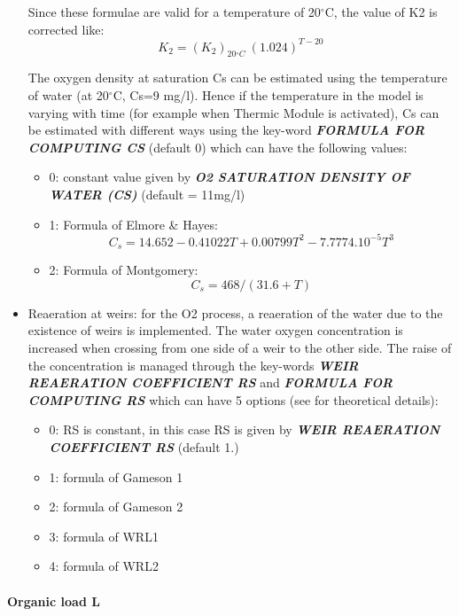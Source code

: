 \begin{itemize}
 Since these formulae are valid for a temperature of 20${}^\circ$C, the value of K2 is corrected like:
\[K_2={\left(K_2\right)}_{20{}^\circ C}\ {\left(1.024\right)}^{T-20}\]


 The oxygen density at saturation Cs can be estimated using the temperature of water (at 20${}^\circ$C, Cs=9 mg/l). Hence if the temperature in the model is varying with time (for example when Thermic Module is activated), Cs can be estimated with different ways using the key-word \textbf{\textit{FORMULA FOR COMPUTING CS}} (default 0) which can have the following values:

\begin{itemize}
\item  0: constant value given by \textbf{\textit{O2 SATURATION DENSITY OF WATER (CS)}} (default = 11mg/l)

\item  1: Formula of Elmore \& Hayes:
\[C_s=14.652-0.41022T+0.00799T^2-7.7774.{10}^{-5}T^3\]

\item  2: Formula of Montgomery:
\[C_s=468/(31.6+T)\]
\end{itemize}

\item  Reaeration at weirs: for the O2 process, a reaeration of the water due to the existence of weirs is implemented. The water oxygen concentration is increased when crossing from one side of a weir to the other side. The raise of the concentration is managed through the key-words \textbf{\textit{WEIR REAERATION COEFFICIENT RS}} and \textbf{\textit{FORMULA FOR COMPUTING RS}} which can have 5 options (see \cite{El-Kadi2012} for theoretical details):
\begin{itemize}
\item  0: RS is constant, in this case RS is given by \textbf{\textit{WEIR REAERATION COEFFICIENT RS }}(default 1.)

\item  1: formula of Gameson 1

\item  2: formula of Gameson 2

\item  3: formula of WRL1

\item  4: formula of WRL2
\end{itemize}
\end{itemize}




\paragraph{  Organic load L}

